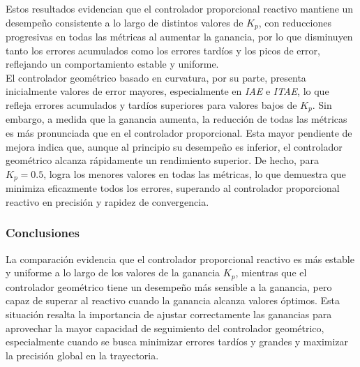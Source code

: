 Estos resultados evidencian que el controlador proporcional reactivo mantiene
un desempeño consistente a lo largo de distintos valores de $K_p$, con reducciones
progresivas en todas las métricas al aumentar la ganancia, por lo que disminuyen
tanto los errores acumulados como los errores tardíos y los picos de error, 
reflejando un comportamiento estable y uniforme. \\

El controlador geométrico basado en curvatura, por su parte, presenta
inicialmente valores de error mayores, especialmente en \textit{IAE} e \textit{ITAE}, lo
que refleja errores acumulados y tardíos superiores para valores bajos de 
$K_p$. Sin embargo, a medida que la ganancia aumenta, la reducción de todas 
las métricas es más pronunciada que en el controlador proporcional. 
Esta mayor pendiente de mejora indica que, aunque al principio su desempeño es inferior,
el controlador geométrico alcanza rápidamente un rendimiento superior. De hecho, para
$K_p = 0.5$, logra los menores valores en todas las métricas, lo que demuestra que 
minimiza eficazmente todos los errores, superando al controlador proporcional reactivo
en precisión y rapidez de convergencia. \\

\subsubsection*{Conclusiones}
La comparación evidencia que el controlador proporcional reactivo es más estable
y uniforme a lo largo de los valores de la ganancia $K_p$, mientras que el controlador
geométrico tiene un desempeño más sensible a la ganancia, pero capaz de superar al
reactivo cuando la ganancia alcanza valores óptimos.
Esta situación resalta la importancia de ajustar correctamente las ganancias 
para aprovechar la mayor capacidad de seguimiento del controlador geométrico, 
especialmente cuando se busca minimizar errores tardíos y grandes y maximizar la
precisión global en la trayectoria.

